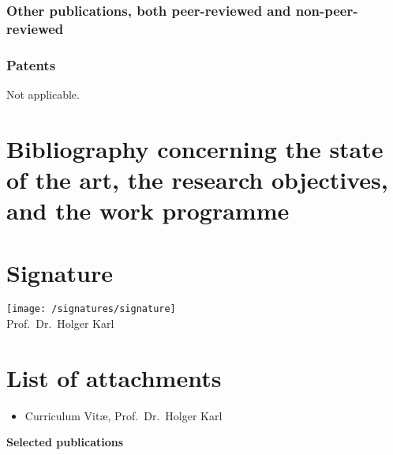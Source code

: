 \documentclass{scrartcl}
\begin{document}
\subsubsection{Other publications, both peer-reviewed and non-peer-reviewed}
\printbibliography[category=nonreviewed, heading=none]


\subsubsection{Patents}

Not applicable. 


 







\section{Bibliography concerning the state of the art, the research objectives, and the work programme}
\label{sec:bib}
\newrefcontext[labelprefix=S]
\printbibliography[notcategory=own_general, notcategory=own_project, heading=none]




\clearpage








\section{Signature}

\texttt{[image: /signatures/signature]}\\
Prof.\ Dr.\ Holger Karl 

\section{List of attachments}
\begin{itemize}
  \item Curriculum Vit\ae, Prof.\ Dr.\ Holger Karl 
\end{itemize}

\clearpage 


\textbf{Selected publications}

\newrefcontext[labelprefix=K]
\printbibliography[category=own_general, heading=none]
\end{document}
